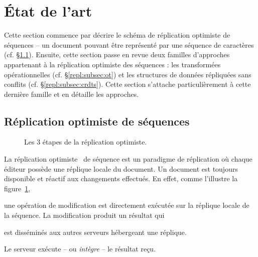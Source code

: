 

\section{État de l'art}
\label{repl:sec:stateoftheart}

Cette section commence par décrire le schéma de réplication optimiste de
séquences -- un document pouvant être représenté par une séquence de caractères
(cf. §\ref{repl:subsec:optimistic}).  Ensuite, cette section passe en revue deux
familles d'approches appartenant à la réplication optimiste des séquences : les
transformées opérationnelles (cf. §\ref{repl:subsec:ot}) et les structures de
données répliquées sans conflits (cf. §\ref{repl:subsec:crdts}). Cette section
s'attache particulièrement à cette dernière famille et en détaille les
approches.

\subsection{Réplication optimiste de séquences}
\label{repl:subsec:optimistic}

\begin{figure}
  \begin{center}
    
    \caption[Étapes de la réplication
    optimiste]{\label{repl:fig:optimisticsteps} Les 3 étapes de la réplication
      optimiste.}    
  \end{center}
\end{figure}

La réplication optimiste~\cite{demers1987epidemic, johnson1975maintenance,
  ladin1992providing, saito2005optimistic} de séquence est un paradigme de
réplication où chaque éditeur possède une réplique locale du document.  Un
document est toujours disponible et réactif aux changements effectués. En effet,
comme l'illustre la figure~\ref{repl:fig:optimisticsteps},
\begin{inparaenum}[(a)]
\item une opération de modification est directement exécutée sur la réplique
  locale de la séquence.  La modification produit un résultat qui
\item est disséminés aux autres serveurs hébergeant une réplique.
\item Le serveur exécute -- ou \emph{intègre} -- le résultat reçu.
\end{inparaenum}

